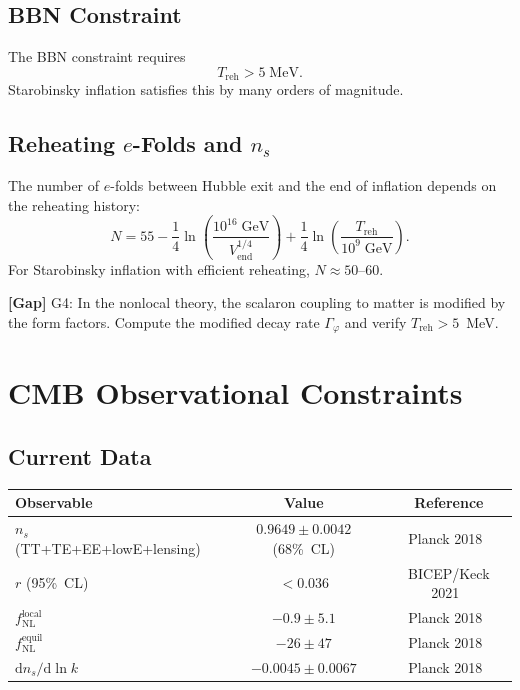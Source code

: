 \documentclass[11pt,a4paper]{article}
\renewcommand{\dd}{\mathrm{d}}
\theoremstyle{plain}
\theoremstyle{definition}
\newcommand{\gap}[1]{%
  \par\smallskip\noindent
  \colorbox{yellow!15}{\parbox{\dimexpr\linewidth-2\fboxsep}{%
    \textcolor{orange!70!black}{\textbf{[Gap]}} #1}}%
  \par\smallskip}
\begin{document}
\subsection{BBN Constraint}

The BBN constraint requires~\cite{Kawasaki00}
\begin{equation}\label{eq:bbn}
  T_{\mathrm{reh}} > 5\;\text{MeV}.
\end{equation}
Starobinsky inflation satisfies this by many orders of magnitude.

\subsection{Reheating $e$-Folds and $n_s$}

The number of $e$-folds between Hubble exit and the end of inflation
depends on the reheating history:
\begin{equation}\label{eq:N-reh}
  N = 55 - \frac{1}{4}\ln\!\left(\frac{10^{16}\;\text{GeV}}{V_{\mathrm{end}}^{1/4}}\right)
  + \frac{1}{4}\ln\!\left(\frac{T_{\mathrm{reh}}}{10^9\;\text{GeV}}\right).
\end{equation}
For Starobinsky inflation with efficient reheating,
$N \approx 50\text{--}60$.

\gap{G4: In the nonlocal theory, the scalaron coupling to matter
is modified by the form factors. Compute the modified decay rate
$\Gamma_\varphi$ and verify $T_{\mathrm{reh}} > 5$~MeV.}

\section{CMB Observational Constraints}\label{sec:cmb}

\subsection{Current Data}

\begin{center}
\renewcommand{\arraystretch}{1.3}
\begin{tabular}{lcc}
\toprule
Observable & Value & Reference \\
\midrule
$n_s$ (TT+TE+EE+lowE+lensing)
  & $0.9649 \pm 0.0042$ (68\%~CL) & Planck 2018~\cite{Planck18X} \\
$r$ (95\%~CL)
  & $< 0.036$ & BICEP/Keck 2021~\cite{BK21} \\
$f_{\mathrm{NL}}^{\mathrm{local}}$
  & $-0.9 \pm 5.1$ & Planck 2018~\cite{Planck18IX} \\
$f_{\mathrm{NL}}^{\mathrm{equil}}$
  & $-26 \pm 47$ & Planck 2018~\cite{Planck18IX} \\
$\dd n_s/\dd \ln k$
  & $-0.0045 \pm 0.0067$ & Planck 2018~\cite{Planck18X} \\
\bottomrule
\end{tabular}
\end{center}
\end{document}
